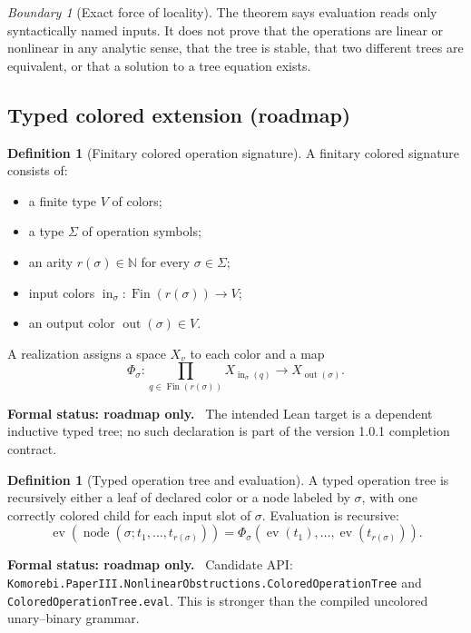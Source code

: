 \documentclass[11pt]{article}
\theoremstyle{definition}
\newtheorem{definition}[theorem]{Definition}
\theoremstyle{remark}
\newtheorem{boundary}[theorem]{Boundary}
\newcommand{\N}{\mathbb N}
\newcommand{\ev}{\operatorname{ev}}
\newcommand{\leanname}[1]{\nolinkurl{#1}}
\newcommand{\statusroadmap}[1]{%
  \par\smallskip\noindent
  {\color{roadmapgray}\textbf{Formal status: roadmap only.}}
  \ #1\par\smallskip}
\begin{document}
\begin{boundary}[Exact force of locality]
The theorem says evaluation reads only syntactically named inputs.  It does
not prove that the operations are linear or nonlinear in any analytic sense,
that the tree is stable, that two different trees are equivalent, or that a
solution to a tree equation exists.
\end{boundary}

\subsection{Typed colored extension (roadmap)}

\begin{definition}[Finitary colored operation signature]
\label{def:signature}
A finitary colored signature consists of:
\begin{itemize}
\item a finite type $V$ of colors;
\item a type $\Sigma$ of operation symbols;
\item an arity $r(\sigma)\in\N$ for every $\sigma\in\Sigma$;
\item input colors
$\operatorname{in}_\sigma:\operatorname{Fin}(r(\sigma))\to V$;
\item an output color $\operatorname{out}(\sigma)\in V$.
\end{itemize}
A realization assigns a space $X_v$ to each color and a map
\[
\Phi_\sigma:
\prod_{q\in\operatorname{Fin}(r(\sigma))}X_{\operatorname{in}_\sigma(q)}
\longrightarrow X_{\operatorname{out}(\sigma)}.
\]
\end{definition}
\statusroadmap{The intended Lean target is a dependent inductive typed tree; no such declaration is part of the version 1.0.1 completion contract.}

\begin{definition}[Typed operation tree and evaluation]
\label{def:operation-tree}
A typed operation tree is recursively either a leaf of declared color or a
node labeled by $\sigma$, with one correctly colored child for each input
slot of $\sigma$.  Evaluation is recursive:
\[
\ev(\operatorname{node}(\sigma;t_1,\ldots,t_{r(\sigma)}))
=
\Phi_\sigma(\ev(t_1),\ldots,\ev(t_{r(\sigma)})).
\]
\end{definition}
\statusroadmap{Candidate API: \leanname{Komorebi.PaperIII.NonlinearObstructions.ColoredOperationTree} and \leanname{ColoredOperationTree.eval}.  This is stronger than the compiled uncolored unary--binary grammar.}
\end{document}

